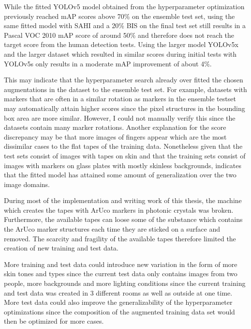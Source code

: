 \documentclass[10pt]{book}
\begin{document}
While the fitted \ac{YOLO}v5 model obtained from the hyperparameter optimization previously reached \ac{mAP} scores above 70\% on the ensemble test set, using the same fitted model with \ac{SAHI} and a 20\% \ac{BIS} on the final test set still results in a Pascal VOC 2010 \ac{mAP} score of around 50\% and therefore does not reach the target score from the human detection tests. Using the larger model \ac{YOLO}v5x and the larger dataset which resulted in similar scores during initial tests with \ac{YOLO}v5s only results in a moderate \ac{mAP} improvement of about 4\%.

This may indicate that the hyperparameter search already over fitted the chosen augmentations in the dataset to the ensemble test set. For example, datasets with markers that are often in a similar rotation as markers in the ensemble testset may automatically attain higher scores since the pixel structures in the bounding box area are more similar. However, I could not manually verify this since the datasets contain many marker rotations. Another explanation for the score discrepancy may be that more images of fingers appear which are the most dissimilar cases to the flat tapes of the training data. %
Nonetheless given that the test sets consist of images with tapes on skin and that the training sets consist of images with markers on glass plates with mostly skinless backgrounds, indicates that the fitted model has attained some amount of generalization over the two image domains.

During most of the implementation and writing work of this thesis, the machine which creates the tapes with \ac{ArUco} markers in photonic crystals was broken. Furthermore, the available tapes can loose some of the substance which contains the \ac{ArUco} marker structures each time they are sticked on a surface and removed. The scarcity and fragility of the available tapes therefore limited the creation of new training and test data. 

More training and test data could introduce new variation in the form of more skin tones and types since the current test data only contains images from two people, more backgrounds and more lighting conditions since the current training and test data was created in 3 different rooms as well as outside at one time. More test data could also improve the generalizability of the hyperparameter optimizations since the composition of the augmented training data set would then be optimized for more cases.
\end{document}
